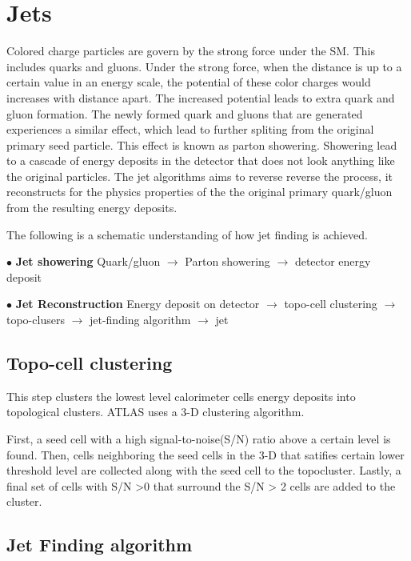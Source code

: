 \section{Jets}
\label{sec:Jet}
Colored charge particles are govern by the strong force under the SM. This includes quarks and gluons. Under the strong force, when the distance is up to a certain value in an energy scale, the potential of these color charges would increases with distance apart. The increased potential leads to extra quark and gluon formation. The newly formed quark and gluons that are generated experiences a similar effect, which lead to further spliting from the original primary seed particle. This effect is known as parton showering. 
Showering lead to a cascade of energy deposits in the detector that does not look anything like the original particles. The jet algorithms aims to reverse reverse the process, it reconstructs for the physics properties of the the original primary quark/gluon from the resulting energy deposits. 

The following is a schematic understanding of how jet finding is achieved. 

$\bullet$ \textbf{Jet showering}
Quark/gluon $\rightarrow$  Parton showering $\rightarrow$ detector energy deposit

$\bullet$ \textbf{Jet Reconstruction}
Energy deposit on detector  $\rightarrow$  topo-cell clustering $\rightarrow$  topo-clusers $\rightarrow$  jet-finding algorithm $\rightarrow$ jet


% 
\subsection*{Topo-cell clustering}
\label{Topocell clustering}
This step clusters the lowest level calorimeter cells energy deposits into topological clusters. ATLAS uses a 3-D clustering algorithm. 

First, a seed cell with a high signal-to-noise(S/N) ratio above a certain level is found. Then, cells neighboring the seed cells in the 3-D that satifies certain lower threshold level are collected along with the seed cell to the topocluster. Lastly, a final set of cells with S/N >0 that surround the S/N > 2 cells are added to the cluster. 

\subsection*{Jet Finding algorithm}
\label{sec:JetFinding}

